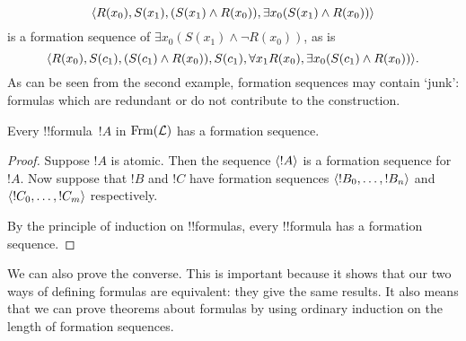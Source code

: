 \documentclass[../../../include/open-logic-section]{subfiles}
\begin{document}
\begin{ex}
\[
\langle 
    R(x_0),
    S(x_1),
    (S(x_1) \land R(x_0)),
    \exists{x_0}(S(x_1) \land R(x_0))
 \rangle
\]
is a formation sequence of
$\exists{x_0}(S(x_1) \land \lnot R(x_0))$, as is
\[
\langle 
    R(x_0),
    S(c_1),
    (S(c_1) \land R(x_0)),
    S(c_1),
    \forall{x_1}R(x_0),
    \exists{x_0}(S(c_1) \land R(x_0))
 \rangle.
\]
%
As can be seen from the second example, formation sequences
may contain `junk': formulas which are redundant or do not
contribute to the construction.
\end{ex}

\begin{prop}
Every !!{formula}~$!A$ in $\Frm[L]$ has a formation sequence.
\end{prop}

\begin{proof}
Suppose $!A$ is atomic. Then the sequence $\langle !A \rangle$ is a
formation sequence for $!A$.
%
Now suppose that $!B$ and $!C$ have formation sequences
$\langle !B_0,\dotsc,!B_n \rangle$ and $\langle !C_0,\dotsc,!C_m \rangle$
respectively.
%
\begin{enumerate}
\end{enumerate}
By the principle of induction on !!{formula}s,
every !!{formula} has a formation sequence.
\end{proof}

We can also prove the converse. This is important because it shows
that our two ways of defining formulas are equivalent: they give
the same results. It also means that we can prove theorems about
formulas by using ordinary induction on the length of formation
sequences.
\end{document}
